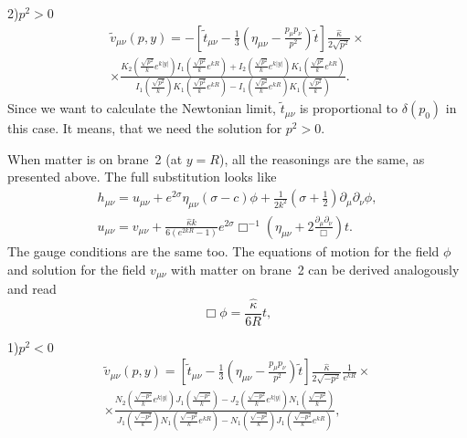 \documentclass[a4paper,12pt]{article}
\begin{document}
2)$p^2>0$
\begin{eqnarray}\label{pbigger0}
\tilde v_{\mu\nu}(p,y)=-\left[\tilde
t_{\mu\nu}-\frac{1}{3}\left(\eta_{\mu\nu}-\frac{p_{\mu}p_{\nu}}{p^2}\right)\tilde
t \right]\frac{\hat\kappa}{2\sqrt{p^2}}\times \\ \nonumber
\times\frac{K_2\left(\frac{\sqrt{p^2}}{k}e^{k|y|}\right)
I_1\left(\frac{\sqrt{p^2}}{k}e^{kR}\right)+I_2\left(\frac{\sqrt{p^2}}{k}e^{k|y|}\right)
K_1\left(\frac{\sqrt{p^2}}{k}e^{kR}\right)}{I_1\left(\frac{\sqrt{p^2}}{k}\right)
K_1\left(\frac{\sqrt{p^2}}{k}e^{kR}\right)-I_1\left(\frac{\sqrt{p^2}}{k}e^{kR}\right)
K_1\left(\frac{\sqrt{p^2}}{k}\right)}.
\end{eqnarray}
Since we want to calculate the Newtonian limit, $\tilde t_{\mu\nu}$
is proportional to $\delta(p_0)$ in this case. It means, that we
need the solution for $p^2>0$.

When  matter is  on brane~2 (at $y=R$), all the reasonings are the
same, as presented above. The full substitution looks like
\begin{eqnarray}\label{subsT2-1}
h_{\mu\nu} = u_{\mu\nu}+e^{2\sigma}\eta_{\mu\nu}(\sigma - c)\phi +
 \frac{1}{2k^2} \left(\sigma  +\frac{1}{2}\right)
 \partial_\mu \partial_\nu \phi, \\ \nonumber
u_{\mu\nu}=v_{\mu\nu} + \frac{\hat\kappa
k}{6(e^{2kR}-1)}e^{2\sigma}\Box^{-1}\left(\eta_{\mu\nu}+
2\frac{\partial_\mu\partial_\nu}{\Box}\right)t.
\end{eqnarray}
The gauge conditions are the same too. The equations of motion for
the field $\phi$ and solution for the field $v_{\mu\nu}$ with matter
on brane~2 can be derived  analogously and read
\begin{equation}\label{eqphi2}
\Box \phi=\frac{\hat\kappa}{6R}t,
\end{equation}

1)$p^2<0$
\begin{eqnarray}
\tilde v_{\mu\nu}(p,y)=\left[\tilde
t_{\mu\nu}-\frac{1}{3}\left(\eta_{\mu\nu}-\frac{p_{\mu}p_{\nu}}{p^2}\right)\tilde
t \right]\frac{\hat\kappa}{2\sqrt{-p^2}}\frac{1}{e^{kR}}\times \\ \nonumber
\times \frac{N_2\left(\frac{\sqrt{-p^2}}{k}e^{k|y|}\right)
J_1\left(\frac{\sqrt{-p^2}}{k}\right)-J_2\left(\frac{\sqrt{-p^2}}{k}e^{k|y|}\right)
N_1\left(\frac{\sqrt{-p^2}}{k}\right)}{J_1\left(\frac{\sqrt{-p^2}}{k}\right)
N_1\left(\frac{\sqrt{-p^2}}{k}e^{kR}\right)-N_1\left(\frac{\sqrt{-p^2}}{k}\right)
J_1\left(\frac{\sqrt{-p^2}}{k}e^{kR}\right)} ,
\end{eqnarray}
\end{document}
